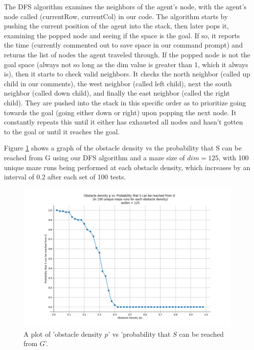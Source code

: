 \documentclass[11pt]{article}
\begin{document}
The DFS algorithm examines the neighbors of the agent's node, with the agent's node called (currentRow, currentCol) in our code. The algorithm starts by pushing the current position of the agent into the stack, then later pops it, examining the popped node and seeing if the space is the goal. If so, it reports the time (currently commented out to save space in our command prompt) and returns the list of nodes the agent traveled through. If the popped node is not the goal space (always not so long as the dim value is greater than 1, which it always is), then it starts to check valid neighbors. It checks the north neighbor (called up child in our comments), the west neighbor (called left child), next the south neighbor (called down child), and finally the east neighbor (called the right child). They are pushed into the stack in this specific order as to prioritize going towards the goal (going either down or right) upon popping the next node. It constantly repeats this until it either has exhausted all nodes and hasn't gotten to the goal or until it reaches the goal.

Figure \ref{DFS_p_vs_successRate} shows a graph of the obstacle density vs the probability that S can be reached from G using our DFS algorithm and a maze size of $dim = 125$, with 100 unique maze runs being performed at each obstacle density, which increases by an interval of 0.2 after each set of 100 tests.

\begin{figure}[h]
\centering
\includegraphics[scale=0.55]{graphs/DFS_obstacleDensity_vs_successRate.PNG}
\caption{A plot of 'obstacle density $p$' vs 'probability that $S$ can be reached from $G$'.}
\label{DFS_p_vs_successRate}
\end{figure}
\end{document}
